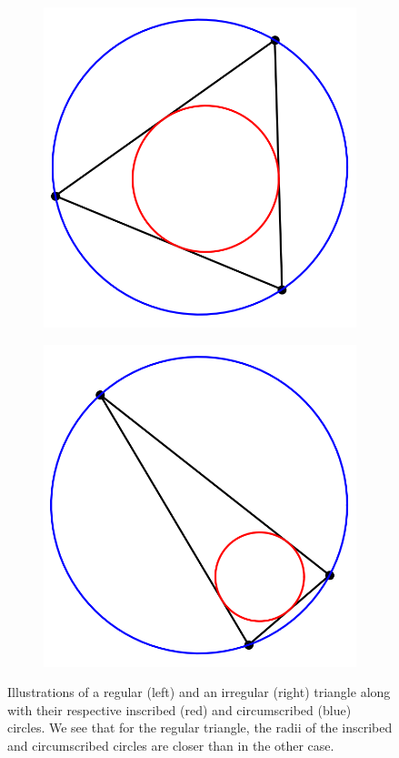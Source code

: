 \documentclass[acmtog]{acmart}
\begin{document}
\begin{figure}
  \centering
  \begin{subfigure}{0.22\textwidth}
    \centering
    \includegraphics[width=\textwidth]{Images/triangle_regular.png}
  \end{subfigure}
  \begin{subfigure}{0.22\textwidth}
    \includegraphics[width=\textwidth]{Images/triangle_iregular.png}
    \centering
  \end{subfigure}\hfill
  \caption{Illustrations of a regular (left) and an irregular (right) triangle along with their respective inscribed (red) and circumscribed (blue) circles. We see that for the regular triangle, the radii of the inscribed and circumscribed circles are closer than in the other case.}
\end{figure}
\end{document}
